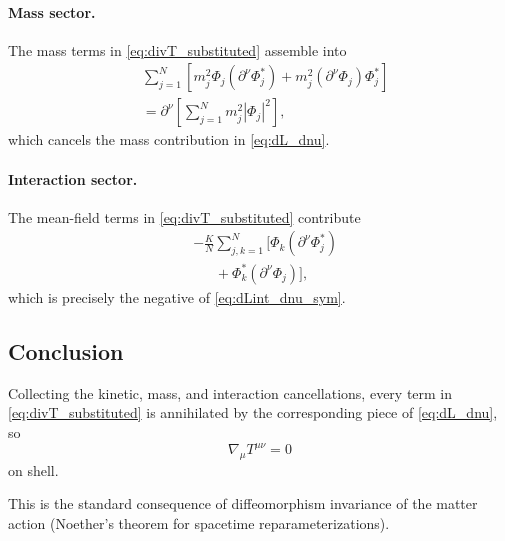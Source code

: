 \paragraph{Mass sector.}
The mass terms in \eqref{eq:divT_substituted} assemble into
\begin{equation}
\begin{aligned}
&\sum_{j=1}^N\left[m_j^2\Phi_j(\partial^\nu\Phi_j^*)+m_j^2(\partial^\nu\Phi_j)\Phi_j^*\right] \\
&=\partial^\nu\left[\sum_{j=1}^Nm_j^2|\Phi_j|^2\right] ,
\end{aligned}
\end{equation}
which cancels the mass contribution in \eqref{eq:dL_dnu}.

\paragraph{Interaction sector.}
The mean-field terms in \eqref{eq:divT_substituted} contribute
\begin{equation}
\begin{aligned}
&-\frac{K}{N}\sum_{j,k=1}^N\Big[\Phi_k(\partial^\nu\Phi_j^*) \\
&\quad\;\;+\Phi_k^*(\partial^\nu\Phi_j)\Big] ,
\end{aligned}
\end{equation}
which is precisely the negative of \eqref{eq:dLint_dnu_sym}.

\subsection{Conclusion}

Collecting the kinetic, mass, and interaction cancellations, every term in \eqref{eq:divT_substituted} is annihilated by the corresponding piece of \eqref{eq:dL_dnu}, so
\begin{equation}
\nabla_\mu T^{\mu\nu}=0
\end{equation}
on shell.

This is the standard consequence of diffeomorphism invariance of the matter action (Noether's theorem for spacetime reparameterizations).
